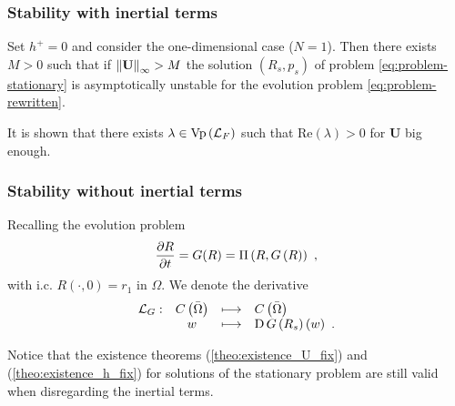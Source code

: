 \documentclass[10pt,aspectratio=169]{beamer}
\begin{document}

\begin{frame}
\frametitle{Stability with inertial terms}
\begin{theorem}\label{theo:instabilite-avec-inertie-U-fixe} Set $h^+=0$ and consider the one-dimensional case ($N=1$). Then there exists $M>0$ such that if $\left\lVert\mathbf{U}\right\rVert_{\infty}>M$ the solution $\left(R_s,p_s\right)$ of problem \eqref{eq:problem-stationary} is asymptotically unstable for the evolution problem \eqref{eq:problem-rewritten}.
\end{theorem}\bigskip
It is shown that there exists $\lambda\in \textnormal{Vp}\left(\mathcal{L}_F\right)$ such that $\mbox{Re}(\lambda)>0$ for $\mathbf{U}$ big enough.
\end{frame}


\begin{frame}\frametitle{Stability without inertial terms}
Recalling the evolution problem
\begin{equation}
\frac{\partial R}{\partial t}=G(R)=\Pi\left(R,G\left(R\right)\right)~,
\end{equation}
with i.c. $R\left(\cdot,0\right)=r_1$ in $\Omega$. We denote the derivative
\begin{equation}
\begin{array}{cccl}
\mathcal{L}_G:&C\left(\bar{\Omega}\right)&\longmapsto& C\left(\bar{\Omega}\right)\\
&w& \longmapsto & \textnormal{D}\,G\left(R_s\right)\left(w\right)~.\label{eq:def-L_G}
\end{array}
\end{equation} 
\bigskip

Notice that the existence theorems (\ref{theo:existence_U_fix}) and (\ref{theo:existence_h_fix}) for solutions of the stationary problem are still valid when disregarding the inertial terms.
\end{frame}

\end{document}
